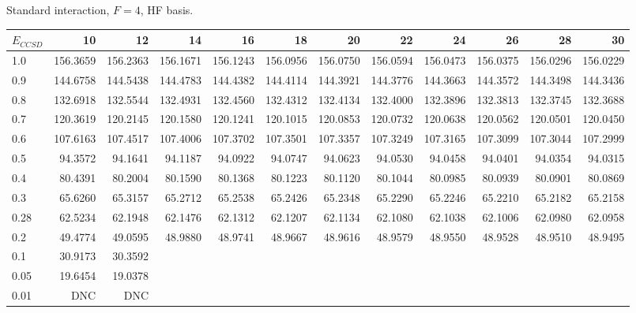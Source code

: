 \begin{landscape}
\begin{table}
\begin{center}
Standard interaction, $F=4$, HF basis.\\
\begin{tabular}{l|rrrrrrrrrrr}
\hline 
$E_{CCSD}$ & 10 & 12 & 14 & 16 & 18 & 20 & 22 & 24 & 26 & 28 & 30 \\
\hline \hline
1.0 & 156.3659 & 156.2363 & 156.1671 & 156.1243 & 156.0956 & 156.0750 & 156.0594 & 156.0473 & 156.0375 & 156.0296 & 156.0229 \\ 
0.9 & 144.6758 & 144.5438 & 144.4783 & 144.4382 & 144.4114 & 144.3921 & 144.3776 & 144.3663 & 144.3572 & 144.3498 & 144.3436 \\ 
0.8 & 132.6918 & 132.5544 & 132.4931 & 132.4560 & 132.4312 & 132.4134 & 132.4000 & 132.3896 & 132.3813 & 132.3745 & 132.3688 \\ 
0.7 & 120.3619 & 120.2145 & 120.1580 & 120.1241 & 120.1015 & 120.0853 & 120.0732 & 120.0638 & 120.0562 & 120.0501 & 120.0450 \\ 
0.6 & 107.6163 & 107.4517 & 107.4006 & 107.3702 & 107.3501 & 107.3357 & 107.3249 & 107.3165 & 107.3099 & 107.3044 & 107.2999 \\ 
0.5 &  94.3572 &  94.1641 &  94.1187 &  94.0922 &  94.0747 &  94.0623 &  94.0530 &  94.0458 &  94.0401 &  94.0354 &  94.0315 \\ 
0.4 &  80.4391 &  80.2004 &  80.1590 &  80.1368 &  80.1223 &  80.1120 &  80.1044 &  80.0985 &  80.0939 &  80.0901 &  80.0869 \\ 
0.3 &  65.6260 &  65.3157 &  65.2712 &  65.2538 &  65.2426 &  65.2348 &  65.2290 &  65.2246 &  65.2210 &  65.2182 &  65.2158 \\ 
0.28&  62.5234 &  62.1948 &  62.1476 &  62.1312 &  62.1207 &  62.1134 &  62.1080 &  62.1038 &  62.1006 &  62.0980 &  62.0958 \\ 
0.2 &  49.4774 &  49.0595 &  48.9880 &  48.9741 &  48.9667 &  48.9616 &  48.9579 &  48.9550 &  48.9528 &  48.9510 &  48.9495 \\ 
0.1 & 30.9173 & 30.3592 &   \\
0.05 & 19.6454 & 19.0378  \\ 
0.01 & DNC & DNC  \\ 
\hline \hline
\end{tabular}
\end{center}
\end{table}
\end{landscape}


